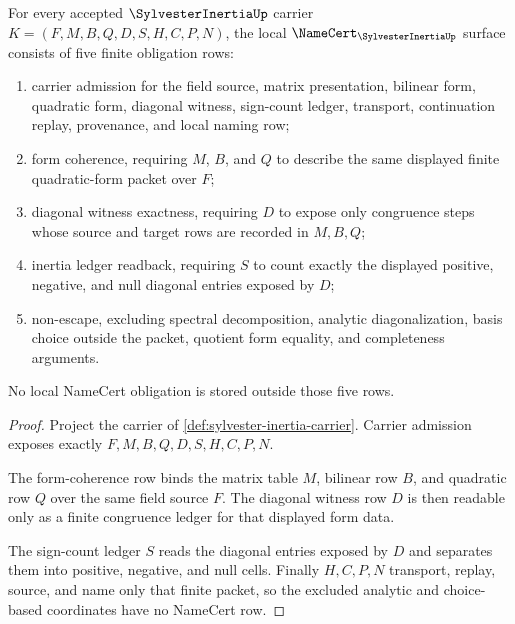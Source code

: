 \begin{theorem}
\label{thm:sylvester-inertia-namecert-obligations}
For every accepted $\SylvesterInertiaUp$ carrier $K=(F,M,B,Q,D,S,H,C,P,N)$, the local $\NameCert_{\SylvesterInertiaUp}$ surface consists of five finite obligation rows:
\begin{enumerate}
\item carrier admission for the field source, matrix presentation, bilinear form, quadratic form, diagonal witness, sign-count ledger, transport, continuation replay, provenance, and local naming row;
\item form coherence, requiring $M$, $B$, and $Q$ to describe the same displayed finite quadratic-form packet over $F$;
\item diagonal witness exactness, requiring $D$ to expose only congruence steps whose source and target rows are recorded in $M,B,Q$;
\item inertia ledger readback, requiring $S$ to count exactly the displayed positive, negative, and null diagonal entries exposed by $D$;
\item non-escape, excluding spectral decomposition, analytic diagonalization, basis choice outside the packet, quotient form equality, and completeness arguments.
\end{enumerate}
No local NameCert obligation is stored outside those five rows.
\end{theorem}
\begin{proof}
Project the carrier of \autoref{def:sylvester-inertia-carrier}. Carrier admission exposes exactly $F,M,B,Q,D,S,H,C,P,N$.

The form-coherence row binds the matrix table $M$, bilinear row $B$, and quadratic row $Q$ over the same field source $F$. The diagonal witness row $D$ is then readable only as a finite congruence ledger for that displayed form data.

The sign-count ledger $S$ reads the diagonal entries exposed by $D$ and separates them into positive, negative, and null cells. Finally $H,C,P,N$ transport, replay, source, and name only that finite packet, so the excluded analytic and choice-based coordinates have no NameCert row.
\end{proof}


